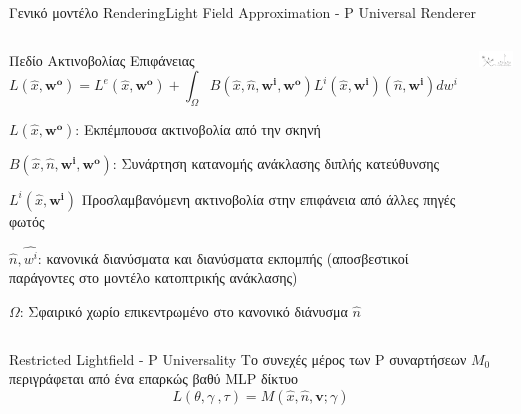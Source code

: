 \documentclass[10pt]{beamer}
\begin{document}
\begin{frame}{Γενικό μοντέλο Rendering}{Light Field Approximation - P Universal Renderer}
\begin{columns}
  \begin{block}{Πεδίο Ακτινοβολίας Επιφάνειας}
    \small{$$L(\hat{x},\boldsymbol{w^o}) = L^{e}(\hat{x},\boldsymbol{w^o}) +  \int_{\Omega}{B(\hat{x},\hat{n},\boldsymbol{w^i},\boldsymbol{w^o}) L^{i}(\hat{x},\boldsymbol{w^i})(\hat{n},\boldsymbol{w^i})dw^i}$$}
        \begin{itemize}
            \tiny{
            \item $L(\hat{x},\boldsymbol{w^o})$: Εκπέμπουσα ακτινοβολία από την σκηνή
            \item $B(\hat{x},\hat{n},\boldsymbol{w^i},\boldsymbol{w^o})$: Συνάρτηση κατανομής ανάκλασης διπλής κατεύθυνσης
            \item $L^{i}(\hat{x},\boldsymbol{w^i})$ Προσλαμβανόμενη ακτινοβολία στην επιφάνεια από άλλες πηγές φωτός
            \item $\hat{n}, \hat{w^i}$: κανονικά διανύσματα και διανύσματα εκπομπής (αποσβεστικοί παράγοντες στο μοντέλο κατοπτρικής ανάκλασης)
            \item $\Omega$: Σφαιρικό χωρίο επικεντρωμένο στο κανονικό διάνυσμα $\hat{n}$}
        \end{itemize}
    \end{block}

      \includegraphics[height=.2\textheight]{images/BRDF_Diagram.jpg}

\end{columns}

\begin{block}{Restricted Lightfield - P Universality}
    Το συνεχές μέρος των P συναρτήσεων \(M_0\) περιγράφεται από ένα επαρκώς βαθύ MLP δίκτυο
    \[L(\theta,\gamma\ ,\tau) = M(\hat{x},\hat{n},\boldsymbol{v};\gamma)\]    
\end{block} 
\end{frame}
\end{document}
